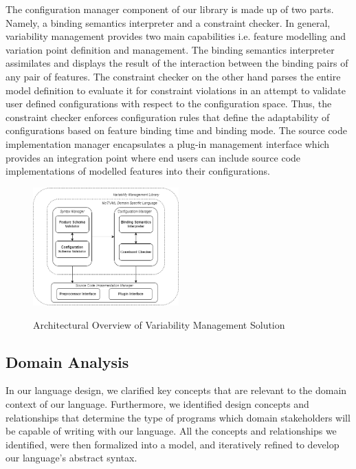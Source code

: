 \documentclass[conference]{IEEEtran}
\begin{document}
The configuration manager component of our library is made up of two parts. Namely, a binding semantics interpreter and a constraint checker. In general, variability management provides two main capabilities i.e. feature modelling and variation point definition and management. The binding semantics interpreter assimilates and displays the result of the interaction between the binding pairs of any pair of features. The constraint checker on the other hand parses the entire model definition to evaluate it for constraint violations in an attempt to validate user defined configurations with respect to the configuration space. Thus, the constraint checker enforces configuration rules that define the adaptability of configurations based on feature binding time and binding mode.
The source code implementation manager encapsulates a plug-in management interface which provides an integration point where end users can include source code implementations of modelled features into their configurations.

\begin{figure}[H]
\caption{Architectural Overview of Variability Management Solution}
\centering
\includegraphics[width=0.5\textwidth]{diagrams/arch-overview.png}
\label{arch-over}
\end{figure}

\subsection{Domain Analysis}
In our language design, we clarified key concepts that are relevant to the domain context of our language. Furthermore, we identified design concepts and relationships that determine the type of programs which domain stakeholders will be capable of writing with our language. All the concepts and relationships we identified, were then formalized into a model, and iteratively refined to develop our language's abstract syntax.
\end{document}
